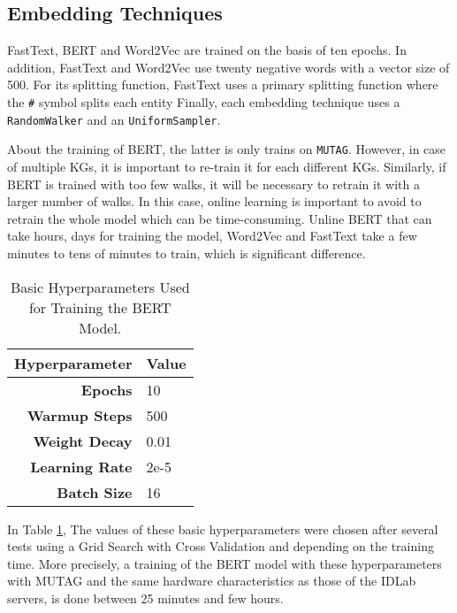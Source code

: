 
\subsection{Embedding Techniques}
\label{subsec:embedding:techniques}

FastText, BERT and Word2Vec are trained on the basis of ten epochs. In addition,
FastText and Word2Vec use twenty negative words with a vector size of 500. For
its splitting function, FastText uses a primary splitting function where the
\texttt{\#} symbol splits each entity Finally, each embedding technique uses a
\texttt{RandomWalker} and an \texttt{UniformSampler}.

About the training of BERT, the latter is only trains on
\texttt{MUTAG}. However, in case of multiple KGs, it is important to re-train it
for each different KGs. Similarly, if BERT is trained with too few walks, it
will be necessary to retrain it with a larger number of walks. In this case,
online learning is important to avoid to retrain the whole model which can be
time-consuming. Unline BERT that can take hours, days for training the model,
Word2Vec and FastText take a few minutes to tens of minutes to train, which is
significant difference.

\begin{table}[!ht]
  \centering
  \begin{tabular}{rl}
    \toprule
    \textbf{Hyperparameter} & \textbf{Value} \\
    \midrule
    \textbf{Epochs} & 10 \\
    \textbf{Warmup Steps} & 500 \\
    \textbf{Weight Decay} & 0.01 \\
    \textbf{Learning Rate} & 2e-5 \\
    \textbf{Batch Size} & 16 \\
    \bottomrule
  \end{tabular}
  \caption{Basic Hyperparameters Used for Training the BERT Model.}
  \label{tab:bert:hyperparameters}
\end{table}

In Table \ref{tab:bert:hyperparameters}, The values of these basic
hyperparameters were chosen after several tests using a Grid Search with Cross
Validation and depending on the training time. More precisely, a training of the
BERT model with these hyperparameters with MUTAG and the same hardware
characteristics as those of the IDLab servers, is done between 25 minutes and
few hours.


